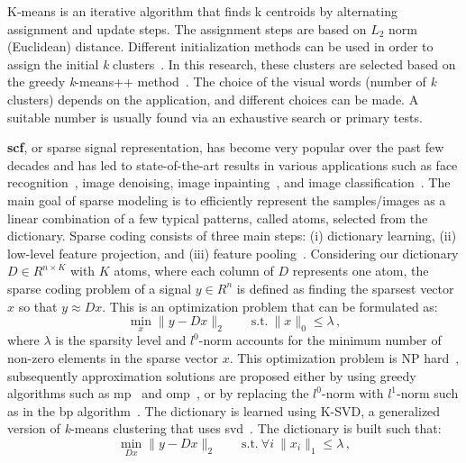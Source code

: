 \begin{description}
K-means is an iterative algorithm that finds k centroids by alternating assignment and update steps.
The assignment steps are based on $L_{2}$ norm (Euclidean) distance.
Different initialization methods can be used in order to assign the initial \textit{k} clusters~\cite{celebi2013comparative}.
In this research, these clusters are selected based on the greedy \textit{k}-means++ method~\cite{arthur2007k}.
The choice of the visual words (number of \textit{k} clusters) depends on the application, and different choices can be made. 
A suitable number is usually found via an exhaustive search or primary tests.  


\item \textbf{\acf{scf}}, or sparse signal representation, has become very popular over the past few decades and has led to state-of-the-art results in various applications such as face recognition~\cite{wright2009robust}, image denoising, image inpainting~\cite{elad2006image}, and image classification~\cite{sidibe2015discrimination}. 
The main goal of sparse modeling is to efficiently represent the samples/images as a linear combination of a few typical patterns, called atoms, selected from the dictionary.
Sparse coding consists of three main steps: (i) dictionary learning, (ii) low-level feature projection, and (iii) feature pooling~\cite{rubinstein2008efficient}. 
Considering our dictionary $D \in R^{n \times K}$ with $K$ atoms, where each column of $D$ represents one atom, the sparse coding problem of a signal $y \in R^{n}$ is defined as finding the sparsest vector $x$ so that $y \approx Dx$. 
This is an optimization problem that can be formulated as:
\begin{equation}
\min_{x} \|y-Dx\|_{2} \qquad \text{s.t.}\ \|x\|_{0} \leq \lambda \,,
\end{equation}  
\noindent where $\lambda$ is the sparsity level and $l^{0}$-norm accounts for the minimum number of non-zero elements in the sparse vector $x$. 
This optimization problem is NP hard~\cite{Elad2010}, subsequently approximation solutions are proposed either by using greedy algorithms such as \ac{mp}~\cite{mallat1993matching} and \ac{omp}~\cite{davis1994adaptive}, or by replacing the $l^{0}$-norm with $l^{1}$-norm such as in the \ac{bp} algorithm~\cite{chen1998atomic}.
The dictionary is learned using K-SVD, a generalized version of \textit{k}-means clustering that uses \ac{svd}~\cite{aharon2006img}. 
The dictionary is built such that:
\begin{equation}
  \min_{Dx} \|y - Dx\|_{2} \qquad  \text{s.t.} \ \forall i \ \|x_{i}\|_{1} \leq \lambda \,,
\end{equation}


\end{description}
